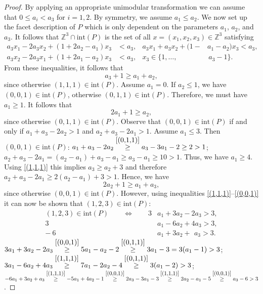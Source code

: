 \documentclass[a4paper]{article}
\theoremstyle{plain}
\begin{document}
\begin{proof}
By applying an appropriate unimodular transformation we can
assume that $0 \leq a_i < a_3$ for $i = 1,2$.
By symmetry, we assume $a_1 \leq a_2$.
We now set up the facet description of $P$ which is only
dependent on the parameters $a_1$, $a_2$, and $a_3$.
It follows that ${\mathbb{Z}}^3 \cap {\mathrm{int}}(P)$ is the set of all
$x = (x_1, x_2, x_3) \in {\mathbb{Z}}^3$ satisfying
\begin{align*}
  a_3 x_1 - 2 a_3 x_2 + (1 + 2a_2 - a_1) x_3 & < a_3, &
  a_3 x_1 + a_3 x_2 + (1 - &a_1 - a_2) x_3 < a_3, \\
  a_3 x_2 - 2 a_3 x_1 + (1 + 2a_1 - a_2) x_3 & < a_3, &
  x_3 \in \{1,\ldots, &\,a_3 - 1\}.
\end{align*}
From these inequalities, it follows that
\begin{equation} \label{(1,1,1)}
  a_3 + 1 \geq a_1 + a_2,
\end{equation}
since otherwise $(1,1,1) \in {\mathrm{int}}(P)$.
Assume $a_1 = 0$.
If $a_2 \leq 1$, we have $(0,0,1) \in {\mathrm{int}}(P)$, otherwise
$(0,1,1) \in {\mathrm{int}}(P)$.
Therefore, we must have $a_1 \geq 1$.
It follows that
\begin{equation} \label{(0,1,1)}
  2a_1 + 1 \geq a_2,
\end{equation}
since otherwise $(0,1,1) \in {\mathrm{int}}(P)$.
Observe that $(0,0,1) \in {\mathrm{int}}(P)$ if and only if $a_1 +
a_3 - 2a_2 > 1$ and $a_2 + a_3 - 2a_1 > 1$.
Assume $a_1 \leq 3$.
Then $(0,0,1) \in {\mathrm{int}}(P)$:
$a_1 + a_3 - 2a_2 \stackrel{\eqref{(0,1,1)}}{\geq} a_3 -
3a_1 - 2 \geq 2 > 1$;
$a_2 + a_3 - 2a_1 = (a_2 - a_1) + a_3 - a_1 \geq a_3 - a_1
\geq 10 > 1$.
Thus, we have $a_1 \geq 4$.
Using \eqref{(1,1,1)} this implies $a_3 \geq a_2 + 3$ and
therefore $a_2 + a_3 - 2a_1 \geq 2(a_2 - a_1) + 3 > 1$.
Hence, we have
\begin{equation} \label{(0,0,1)}
  2a_2 + 1 \geq  a_1 + a_3,
\end{equation}
since otherwise $(0,0,1) \in {\mathrm{int}}(P)$.
However, using inequalities \eqref{(1,1,1)}--\eqref{(0,0,1)}
it can now be shown that $(1,2,3) \in {\mathrm{int}}(P)$:
\begin{align*}
  (1,2,3) \in {\mathrm{int}}(P) \qquad \Longleftrightarrow \qquad
      3&a_1 + 3a_2 - 2a_3 > 3, \\
      3&a_1 - 6a_2 + 4a_3 > 3, \\
    -~6&a_1 + 3a_2 + \ \, a_3 > 3.
\end{align*}
$3a_1 + 3a_2 - 2a_3 \stackrel{\eqref{(0,0,1)}}{\geq} 5a_1 - a_2 - 2
\stackrel{\eqref{(0,1,1)}}{\geq} 3a_1 - 3 = 3(a_1  -1) > 3$;
$3a_1 - 6a_2 + 4a_3 \stackrel{\eqref{(1,1,1)}}{\geq} 7a_1 - 2a_2 - 4
\stackrel{\eqref{(0,1,1)}}{\geq} 3(a_1 - 2) > 3$;
$-6a_1 + 3a_2 + a_3 \stackrel{\eqref{(1,1,1)}}{\geq} -5a_1 + 4a_2 - 1
\stackrel{\eqref{(0,0,1)}}{\geq} 2a_3 - 3a_1 - 3
\stackrel{\eqref{(1,1,1)}}{\geq} 2a_2 - a_1 - 5
\stackrel{\eqref{(0,0,1)}}{\geq} a_3 - 6 > 3$.
\end{proof}
\end{document}
